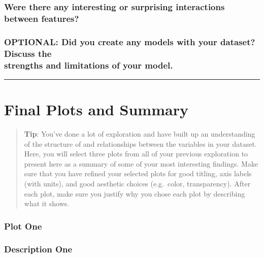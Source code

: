\documentclass[]{article}
\begin{document}
\subsubsection{Were there any interesting or surprising interactions
between
features?}\label{were-there-any-interesting-or-surprising-interactions-between-features}

\subsubsection{\texorpdfstring{OPTIONAL: Did you create any models with
your dataset? Discuss the\\
strengths and limitations of your
model.}{OPTIONAL: Did you create any models with your dataset? Discuss the strengths and limitations of your model.}}\label{optional-did-you-create-any-models-with-your-dataset-discuss-the-strengths-and-limitations-of-your-model.}

\begin{center}\rule{0.5\linewidth}{\linethickness}\end{center}

\section{Final Plots and Summary}\label{final-plots-and-summary}

\begin{quote}
\textbf{Tip}: You've done a lot of exploration and have built up an
understanding of the structure of and relationships between the
variables in your dataset. Here, you will select three plots from all of
your previous exploration to present here as a summary of some of your
most interesting findings. Make sure that you have refined your selected
plots for good titling, axis labels (with units), and good aesthetic
choices (e.g.~color, transparency). After each plot, make sure you
justify why you chose each plot by describing what it shows.
\end{quote}

\subsubsection{Plot One}\label{plot-one}

\subsubsection{Description One}\label{description-one}
\end{document}
